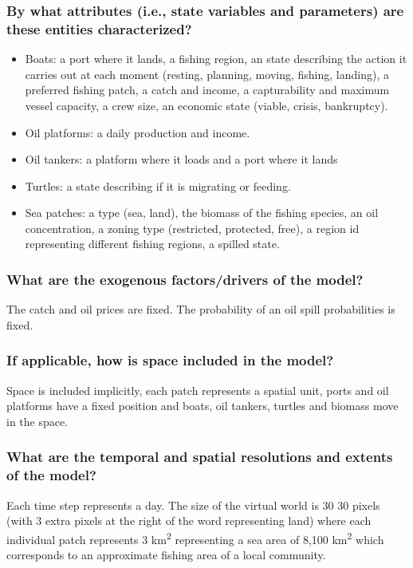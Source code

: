 \documentclass[11pt]{article}
\begin{document}
\subsubsection{By what attributes (i.e., state variables and parameters) are these  entities characterized?}
\label{sec:orgf51fbdd}
\begin{itemize}
\item Boats: a port where it lands, a fishing region, an state describing the action it carries out at each moment (resting, planning, moving, fishing, landing), a preferred fishing patch, a catch and income, a capturability and maximum vessel capacity, a crew size, an economic state (viable, crisis, bankruptcy).
\item Oil platforms: a daily production and income.
\item Oil tankers: a platform where it loads and a port where it lands
\item Turtles: a state describing if it is migrating or feeding.
\item Sea patches: a type (sea, land), the biomass of the fishing species, an oil concentration, a zoning type (restricted, protected, free), a region id representing different fishing regions, a spilled state.
\end{itemize}
\subsubsection{What are the exogenous factors/drivers of the model?}
\label{sec:org0eba9fd}
The catch and oil prices are fixed. The probability of an oil spill probabilities is fixed. 
\subsubsection{If applicable, how is space included in the model?}
\label{sec:org24f53b7}
Space is included implicitly, each patch represents a spatial unit, ports and oil platforms have a fixed position and boats, oil tankers, turtles and biomass move in the space.
\subsubsection{What are the temporal and spatial resolutions and extents of the model?}
\label{sec:orgef37932}
Each time step represents a day. The size of the virtual world is 30 \texttimes{} 30 pixels (with 3 extra pixels at the right of the word representing land) where each individual patch represents 3 km\textsuperscript{2} representing a sea area of 8,100 km\textsuperscript{2} which corresponds to an approximate fishing area of a local community.
\end{document}
